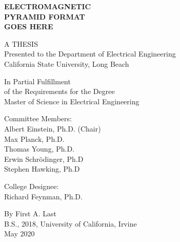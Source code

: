 \begin{titlepage}
\begin{center}

	\doublespacing
	\textbf{ELECTROMAGNETIC \\ PYRAMID FORMAT \\ GOES HERE}
	
	\vfill

	A THESIS \\
	Presented to the Department of Electrical Engineering \\
	California State University, Long Beach

	\vfill

	In Partial Fulfillment \\
	of the Requirements for the Degree \\
	Master of Science in Electrical Engineering

	\vfill

	Committee Members: \\
	\singlespacing
	Albert Einstein, Ph.D. (Chair) \\
	Max Planck, Ph.D. \\
	Thomas Young, Ph.D. \\
	Erwin Schr\"{o}dinger, Ph.D \\
	Stephen Hawking, Ph.D \\

	\doublespacing

	College Designee: \\
	Richard Feynman, Ph.D. \\

	\vfill

	By First A. Last \\
	B.S., 2018, University of California, Irvine\\
	May 2020	
\end{center}
\end{titlepage}
